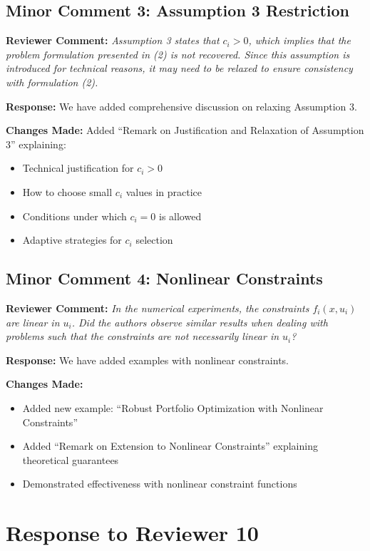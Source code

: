 \documentclass[11pt]{article}
\newcommand{\reviewercomment}[1]{\textbf{Reviewer Comment:} \textit{#1}}
\newcommand{\response}[1]{\textbf{Response:} #1}
\newcommand{\changes}[1]{\textbf{Changes Made:} #1}
\begin{document}
\subsection*{Minor Comment 3: Assumption 3 Restriction}

\reviewercomment{Assumption 3 states that $c_i > 0$, which implies that the problem formulation presented in (2) is not recovered. Since this assumption is introduced for technical reasons, it may need to be relaxed to ensure consistency with formulation (2).}

\response{We have added comprehensive discussion on relaxing Assumption 3.}

\changes{Added ``Remark on Justification and Relaxation of Assumption 3'' explaining:
\begin{itemize}
\item Technical justification for $c_i > 0$
\item How to choose small $c_i$ values in practice
\item Conditions under which $c_i = 0$ is allowed
\item Adaptive strategies for $c_i$ selection
\end{itemize}
}

\subsection*{Minor Comment 4: Nonlinear Constraints}

\reviewercomment{In the numerical experiments, the constraints $f_i(x, u_i)$ are linear in $u_i$. Did the authors observe similar results when dealing with problems such that the constraints are not necessarily linear in $u_i$?}

\response{We have added examples with nonlinear constraints.}

\changes{
\begin{itemize}
\item Added new example: ``Robust Portfolio Optimization with Nonlinear Constraints''
\item Added ``Remark on Extension to Nonlinear Constraints'' explaining theoretical guarantees
\item Demonstrated effectiveness with nonlinear constraint functions
\end{itemize}
}

\section*{Response to Reviewer 10}
\end{document}
